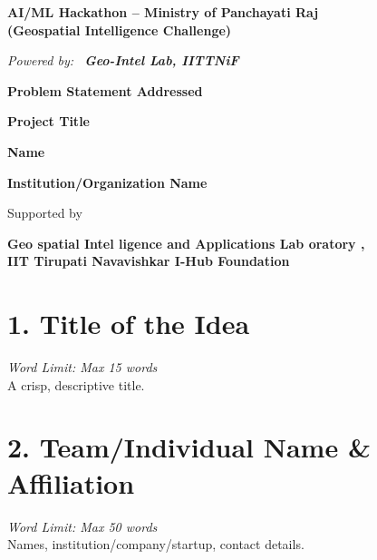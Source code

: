 \documentclass[12pt, a4paper]{article}
\newcommand{\GeoIntelLab}{%
	{\color{darkred}\textbf{Geo}}%
	{\color{black}\textbf{spatial }}%
	{\color{darkred}\textbf{Intel}}%
	{\color{black}\textbf{ligence and Applications }}%
	{\color{darkred}\textbf{Lab}}%
	{\color{black}\textbf{oratory}}%
}
\begin{document}
	
	\thispagestyle{fancy}          %
	\vspace*{1.5cm}
	
	{\centering
		{\LARGE\bfseries AI/ML Hackathon – Ministry of Panchayati Raj\\[4pt]
			(Geospatial Intelligence Challenge)}\par
		\vspace{6pt}
		{\large\itshape Powered by:\ %
			{\color{crimson}\bfseries Geo-Intel Lab, IITTNiF}}\par
		\vspace{1.8cm}
		
		{\large\bfseries Problem Statement Addressed}\par
		\vspace{0.5cm}
		{\large\bfseries Project Title}\par
		\vspace{0.5cm}
		{\normalsize\bfseries Name}\par   %
		\vspace{4cm}
		
		{\large\bfseries Institution/Organization Name}\par
		\vspace{4cm}
		
		{\normalfont Supported by}\par
		\vspace{4pt}
		{\large\bfseries \GeoIntelLab,\\[2pt]
			IIT Tirupati Navavishkar I-Hub Foundation}\par
	}
	
	\newpage
	
	
	\section*{\textbf{1. Title of the Idea}}
	\textit{Word Limit: Max 15 words}\\
	A crisp, descriptive title.
	
	\vspace{0.8cm}
	
	\section*{\textbf{2. Team/Individual Name \& Affiliation}}
	\textit{Word Limit: Max 50 words}\\
	Names, institution/company/startup, contact details.
	
\end{document}
